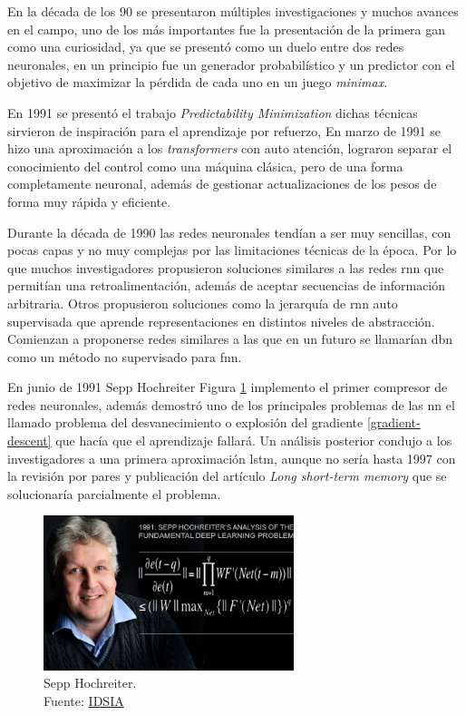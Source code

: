 En la década de los 90 se presentaron múltiples investigaciones y muchos avances en el campo, uno de los más importantes fue la presentación de la primera \acrshort{gan} como una curiosidad, ya que se presentó como un duelo entre dos redes neuronales, en un principio fue un generador probabilístico y un predictor con el objetivo de maximizar la pérdida de cada uno en un juego \textit{minimax}.

En 1991 se presentó el trabajo \textit{Predictability Minimization} \cite{urgen1991learning} dichas técnicas sirvieron de inspiración para el aprendizaje por refuerzo,
En marzo de 1991 se hizo una aproximación a los \textit{transformers} con auto atención, lograron separar el conocimiento del control como una máquina clásica, pero de una forma completamente neuronal, además de gestionar actualizaciones de los pesos de forma muy rápida y eficiente.

Durante la década de 1990 las redes neuronales tendían a ser muy sencillas, con pocas capas y no muy complejas por las limitaciones técnicas de la época.
Por lo que muchos investigadores propusieron soluciones similares a las redes \acrshort{rnn} que permitían una retroalimentación, además de aceptar secuencias de información arbitraria.
Otros propusieron soluciones como la jerarquía de \acrshort{rnn} auto supervisada que aprende representaciones en distintos niveles de abstracción.
Comienzan a proponerse redes similares a las que en un futuro se llamarían \acrshort{dbn} como un método no supervisado para \acrshort{fnn}.

En junio de 1991 {Sepp Hochreiter} Figura \ref{fig:sepp-hochreiter} implemento el primer compresor de redes neuronales, además demostró uno de los principales problemas de las \acrshort{nn} el llamado problema del desvanecimiento o explosión del gradiente \ref{gradient-descent} que hacía que el aprendizaje fallará.
Un análisis posterior condujo a los investigadores a una primera aproximación \acrshort{lstm}, aunque no sería hasta 1997 con la revisión por pares y publicación del artículo \textit{Long short-term memory} \cite{hochreiter1997long} que se solucionaría parcialmente el problema.

\begin{figure}[H]
  \centering
  \includegraphics[width=0.65\textwidth]{figures/Sepp Hochreiter.jpg}
  \caption{Sepp Hochreiter.\\Fuente: \href{https://people.idsia.ch/~juergen/fundamentaldeeplearningproblem.html}{IDSIA}}
  \label{fig:sepp-hochreiter}
\end{figure}

